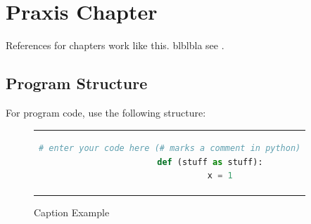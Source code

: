 
\chapter{Praxis Chapter}\label{chapter:dimensionwise_refinement}

	References for chapters work like this. blblbla see .
			
	\section{Program Structure}
	
		For program code, use the following structure:
		
		\begin{figure}[htbp]
			\centering
			\begin{tabular}{c}
				\begin{lstlisting}[language=python]
				# enter your code here (# marks a comment in python)
				def (stuff as stuff):
					x = 1
				\end{lstlisting}
			\end{tabular}
			\caption{Caption Example}
			\label{fig:code_integrator}
		\end{figure}